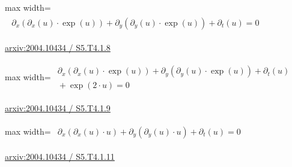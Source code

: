 \documentclass[UTF8,10pt,a4paper,fontset=mac]{ctexart}
\begin{document}
\begin{minipage}{\linewidth}\begin{center}\begin{adjustbox}{max width=\linewidth}$\displaystyle\begin{gathered}\begin{gathered}\partial_{x}(\partial_{x}(u)\cdot \exp(u))+\partial_{y}(\partial_{y}(u)\cdot \exp(u))+\partial_{t}(u)=0\end{gathered}\end{gathered}$\end{adjustbox}\end{center}{\small\href{https://arxiv.org/html/2004.10434#S5.T4.1.8}{arxiv:2004.10434 / S5.T4.1.8}}\par\end{minipage}\par\vspace{6mm}

\begin{minipage}{\linewidth}\begin{center}\begin{adjustbox}{max width=\linewidth}$\displaystyle\begin{gathered}\begin{gathered}\partial_{x}(\partial_{x}(u)\cdot \exp(u))+\partial_{y}(\partial_{y}(u)\cdot \exp(u))+\partial_{t}(u)\\[-1pt]{}+\exp(2\cdot u)=0\end{gathered}\end{gathered}$\end{adjustbox}\end{center}{\small\href{https://arxiv.org/html/2004.10434#S5.T4.1.9}{arxiv:2004.10434 / S5.T4.1.9}}\par\end{minipage}\par\vspace{6mm}

\begin{minipage}{\linewidth}\begin{center}\begin{adjustbox}{max width=\linewidth}$\displaystyle\begin{gathered}\begin{gathered}\partial_{x}(\partial_{x}(u)\cdot u)+\partial_{y}(\partial_{y}(u)\cdot u)+\partial_{t}(u)=0\end{gathered}\end{gathered}$\end{adjustbox}\end{center}{\small\href{https://arxiv.org/html/2004.10434#S5.T4.1.11}{arxiv:2004.10434 / S5.T4.1.11}}\par\end{minipage}\par\vspace{6mm}
\end{document}
